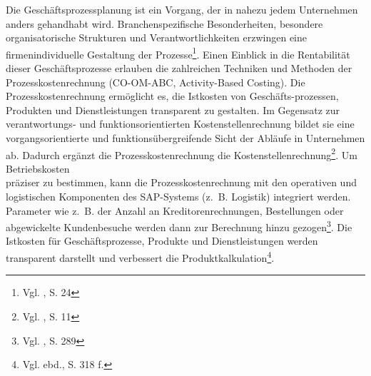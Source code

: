 Die Geschäftsprozessplanung ist ein Vorgang, der in nahezu jedem Unternehmen anders gehandhabt wird. Branchenspezifische Besonderheiten, besondere organisatorische Strukturen und Verantwortlichkeiten erzwingen eine firmenindividuelle Gestaltung der Prozesse\footnote{Vgl. \cite{Friedl2008}, S. 24}. Einen Einblick in die Rentabilität dieser Geschäftsprozesse erlauben die zahlreichen Techniken und Methoden der Prozesskostenrechnung (CO-OM-ABC, Activity-Based Costing). Die Prozesskostenrechnung ermöglicht es, die Istkosten von Geschäfts-prozessen, Produkten und Dienstleistungen transparent zu gestalten. Im Gegensatz zur verantwortungs- und funktionsorientierten Kostenstellenrechnung bildet sie eine vorgangsorientierte und funktionsübergreifende Sicht der Abläufe in Unternehmen ab. Dadurch ergänzt die Prozesskostenrechnung die Kostenstellenrechnung\footnote{Vgl. \cite{SAPCOOMABC2001}, S. 11}. 
Um Betriebskosten \\präziser zu bestimmen, kann die Prozesskostenrechnung mit den operativen und logistischen Komponenten des SAP-Systems (z.~B. Logistik) integriert werden. Parameter wie z.~B. der Anzahl an Kreditorenrechnungen, Bestellungen oder abgewickelte Kundenbesuche werden dann zur Berechnung hinzu gezogen\footnote{Vgl. \cite{Patel2009}, S. 289}. 
Die Istkosten für Geschäftsprozesse, Produkte und Dienstleistungen werden transparent darstellt und verbessert die Produktkalkulation\footnote{Vgl. ebd., S. 318 f.}.


